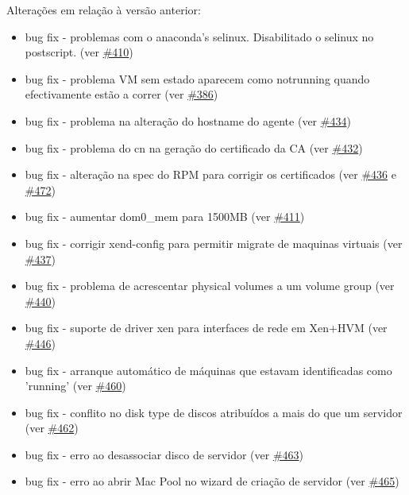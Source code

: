 Alterações em relação à versão anterior:

\begin{itemize}
	\item bug fix - problemas com o anaconda's selinux. Disabilitado o selinux no postscript. (ver \href{https://srcmaster.eurotux.com/pm/p/etva/ticket/410}{\#410})
	\item bug fix - problema VM sem estado aparecem como notrunning quando efectivamente estão a correr (ver \href{https://srcmaster.eurotux.com/pm/p/etva/ticket/386}{\#386})
	\item bug fix - problema na alteração do hostname do agente (ver \href{https://srcmaster.eurotux.com/pm/p/etva/ticket/434}{\#434})
	\item bug fix - problema do cn na geração do certificado da CA (ver \href{https://srcmaster.eurotux.com/pm/p/etva/ticket/432}{\#432})
	\item bug fix - alteração na spec do RPM para corrigir os certificados (ver \href{https://srcmaster.eurotux.com/pm/p/etva/ticket/436}{\#436} e \href{https://srcmaster.eurotux.com/pm/p/etva/ticket/472}{\#472})
	\item bug fix - aumentar dom0\_mem para 1500MB (ver \href{https://srcmaster.eurotux.com/pm/p/etva/ticket/411}{\#411})
	\item bug fix - corrigir xend-config para permitir migrate de maquinas virtuais (ver \href{https://srcmaster.eurotux.com/pm/p/etva/ticket/437}{\#437})
	\item bug fix - problema de acrescentar physical volumes a um volume group (ver \href{https://srcmaster.eurotux.com/pm/p/etva/ticket/440}{\#440})
	\item bug fix - suporte de driver xen para interfaces de rede em Xen+HVM (ver \href{https://srcmaster.eurotux.com/pm/p/etva/ticket/446}{\#446})
	\item bug fix - arranque automático de máquinas que estavam identificadas como 'running' (ver \href{https://srcmaster.eurotux.com/pm/p/etva/ticket/460}{\#460})
	\item bug fix - conflito no disk type de discos atribuídos a mais do que um servidor (ver \href{https://srcmaster.eurotux.com/pm/p/etva/ticket/462}{\#462})
	\item bug fix - erro ao desassociar disco de servidor (ver \href{https://srcmaster.eurotux.com/pm/p/etva/ticket/463}{\#463})
	\item bug fix - erro ao abrir Mac Pool no wizard de criação de servidor (ver \href{https://srcmaster.eurotux.com/pm/p/etva/ticket/465}{\#465})

\end{itemize}

